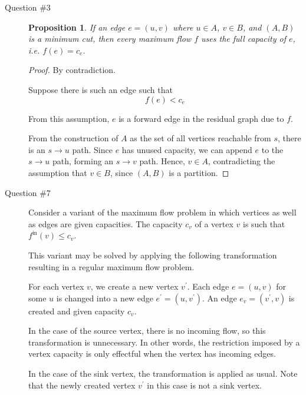 \documentclass[letterpaper,11pt]{article}
\newtheorem{proposition}{Proposition}
\begin{document}
\begin{description}
    \item[Question \#3]

        \begin{proposition}
            If an edge $e = (u, v)$ where $u \in A$, $v \in B$, and $(A, B)$ is
            a minimum cut, then every maximum flow $f$ uses the full capacity
            of $e$, i.e. $f(e) = c_e$.
        \end{proposition}

        \begin{proof}
            By contradiction.

            Suppose there is such an edge such that
            \begin{equation}
                f(e) < c_e
                \label{eq:max-flow-contradiction}
            \end{equation}

            From this assumption, $e$ is a forward edge in the residual graph
            due to $f$.

            From the construction of $A$ as the set of all vertices reachable
            from $s$, there is an $s \to u$ path. Since $e$ has unused
            capacity, we can append $e$ to the $s \to u$ path, forming an $s
            \to v$ path. Hence, $v \in A$, contradicting the assumption that
            $v \in B$, since $(A, B)$ is a partition.
        \end{proof}

    \item[Question \#7]

        Consider a variant of the maximum flow problem in which vertices as
        well as edges are given capacities. The capacity $c_v$ of a vertex $v$
        is such that $f^\mathrm{in}(v) \leq c_v$.

        This variant may be solved by applying the following transformation
        resulting in a regular maximum flow problem.

        For each vertex $v$, we create a new vertex $v^\prime$. Each edge
        $e = (u, v)$ for some $u$ is changed into a new edge
        $e^\prime = (u, v^\prime)$. An edge $e_v = (v^\prime, v)$ is created
        and given capacity $c_v$.

        In the case of the source vertex, there is no incoming flow, so this
        transformation is unnecessary. In other words, the restriction imposed
        by a vertex capacity is only effectful when the vertex has incoming
        edges.

        In the case of the sink vertex, the transformation is applied as usual.
        Note that the newly created vertex $v^\prime$ in this case is not a
        sink vertex.

\end{description}
\end{document}
